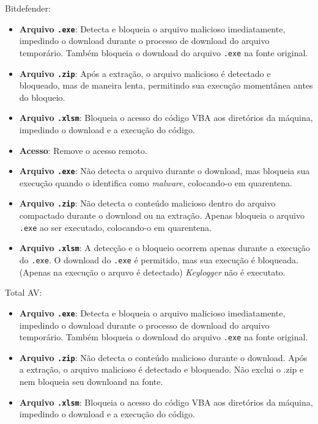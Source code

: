 \documentclass[12pt]{article}
\begin{document}
\noindent Bitdefender:
\begin{itemize}
    \item \textbf{Arquivo \texttt{.exe}}: Detecta e bloqueia o arquivo malicioso imediatamente, impedindo o download durante o processo de download do arquivo temporário. Também bloqueia o download do arquivo \texttt{.exe} na fonte original.
    \item \textbf{Arquivo \texttt{.zip}}: Após a extração, o arquivo malicioso é detectado e bloqueado, mas de maneira lenta, permitindo sua execução momentânea antes do bloqueio.
    \item \textbf{Arquivo \texttt{.xlsm}}: Bloqueia o acesso do código VBA aos diretórios da máquina, impedindo o download e a execução do código.
    \item \textbf{Acesso}: Remove o acesso remoto.
\end{itemize}

\begin{itemize}
    \item \textbf{Arquivo \texttt{.exe}}: Não detecta o arquivo durante o download, mas bloqueia sua execução quando o identifica como \textit{malware}, colocando-o em quarentena.
    \item \textbf{Arquivo \texttt{.zip}}: Não detecta o conteúdo malicioso dentro do arquivo compactado durante o download ou na extração. Apenas bloqueia o arquivo \texttt{.exe} ao ser executado, colocando-o em quarentena.
    \item \textbf{Arquivo \texttt{.xlsm}}: A detecção e o bloqueio ocorrem apenas durante a execução do \texttt{.exe}. O download do \texttt{.exe} é permitido, mas sua execução é bloqueada. (Apenas na execução o arquvo é detectado) \textit{Keylogger} não é executato.
\end{itemize}

\noindent Total AV:
\begin{itemize}
    \item \textbf{Arquivo \texttt{.exe}}: Detecta e bloqueia o arquivo malicioso imediatamente, impedindo o download durante o processo de download do arquivo temporário. Também bloqueia o download do arquivo \texttt{.exe} na fonte original.
    \item \textbf{Arquivo \texttt{.zip}}: Não detecta o conteúdo malicioso durante o download. Após a extração, o arquivo malicioso é detectado e bloqueado. Não exclui o .zip e nem bloqueia seu downloand na fonte.
    \item \textbf{Arquivo \texttt{.xlsm}}: Bloqueia o acesso do código VBA aos diretórios da máquina, impedindo o download e a execução do código.
\end{itemize}
\end{document}
